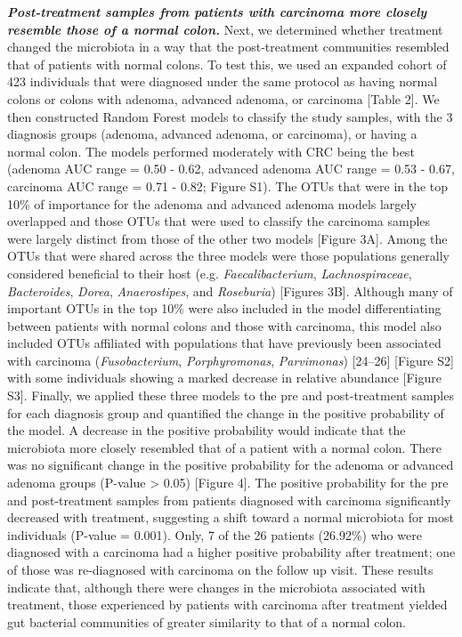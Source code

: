 \documentclass[12pt,]{article}
\begin{document}
\textbf{\emph{Post-treatment samples from patients with carcinoma more
closely resemble those of a normal colon.}} Next, we determined whether
treatment changed the microbiota in a way that the post-treatment
communities resembled that of patients with normal colons. To test this,
we used an expanded cohort of 423 individuals that were diagnosed under
the same protocol as having normal colons or colons with adenoma,
advanced adenoma, or carcinoma {[}Table 2{]}. We then constructed Random
Forest models to classify the study samples, with the 3 diagnosis groups
(adenoma, advanced adenoma, or carcinoma), or having a normal colon. The
models performed moderately with CRC being the best (adenoma AUC range =
0.50 - 0.62, advanced adenoma AUC range = 0.53 - 0.67, carcinoma AUC
range = 0.71 - 0.82; Figure S1). The OTUs that were in the top 10\% of
importance for the adenoma and advanced adenoma models largely
overlapped and those OTUs that were used to classify the carcinoma
samples were largely distinct from those of the other two models
{[}Figure 3A{]}. Among the OTUs that were shared across the three models
were those populations generally considered beneficial to their host
(e.g. \emph{Faecalibacterium}, \emph{Lachnospiraceae},
\emph{Bacteroides}, \emph{Dorea}, \emph{Anaerostipes}, and
\emph{Roseburia}) {[}Figures 3B{]}. Although many of important OTUs in
the top 10\% were also included in the model differentiating between
patients with normal colons and those with carcinoma, this model also
included OTUs affiliated with populations that have previously been
associated with carcinoma (\emph{Fusobacterium}, \emph{Porphyromonas},
\emph{Parvimonas}) {[}24--26{]} {[}Figure S2{]} with some individuals
showing a marked decrease in relative abundance {[}Figure S3{]}.
Finally, we applied these three models to the pre and post-treatment
samples for each diagnosis group and quantified the change in the
positive probability of the model. A decrease in the positive
probability would indicate that the microbiota more closely resembled
that of a patient with a normal colon. There was no significant change
in the positive probability for the adenoma or advanced adenoma groups
(P-value \textgreater{} 0.05) {[}Figure 4{]}. The positive probability
for the pre and post-treatment samples from patients diagnosed with
carcinoma significantly decreased with treatment, suggesting a shift
toward a normal microbiota for most individuals (P-value = 0.001). Only,
7 of the 26 patients (26.92\%) who were diagnosed with a carcinoma had a
higher positive probability after treatment; one of those was
re-diagnosed with carcinoma on the follow up visit. These results
indicate that, although there were changes in the microbiota associated
with treatment, those experienced by patients with carcinoma after
treatment yielded gut bacterial communities of greater similarity to
that of a normal colon.
\end{document}
